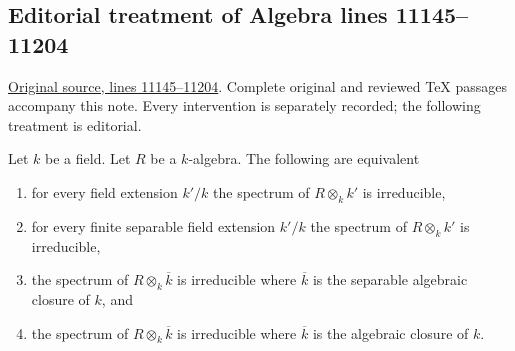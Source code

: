 \subsection{Editorial treatment of Algebra lines 11145--11204}

\hypertarget{algebra-context-138}{}

\noindent\href{https://github.com/stacks/stacks-project/blob/a04446e57ec1fbc252a871afcec7752fb2807b14/algebra.tex\#L11145}{Original source, lines 11145--11204}. Complete original and reviewed TeX passages accompany this note. Every intervention is separately recorded; the following treatment is editorial.


\begin{lemma}
\label{editorial-source-lemma-geometrically-irreducible}
Let $k$ be a field.
Let $R$ be a $k$-algebra.
The following are equivalent
\begin{enumerate}
\item for every field extension $k'/k$ the
spectrum of $R \otimes_k k'$ is irreducible,
\item for every finite separable field extension $k'/k$ the
spectrum of $R \otimes_k k'$ is irreducible,
\item the spectrum of $R \otimes_k \overline{k}$ is irreducible
where $\overline{k}$ is the separable algebraic closure of $k$, and
\item the spectrum of $R \otimes_k \overline{k}$ is irreducible
where $\overline{k}$ is the algebraic closure of $k$.
\end{enumerate}
\end{lemma}

